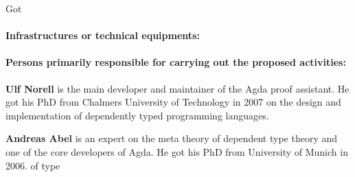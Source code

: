 \begin{sitedescription}{Got}
\paragraph*{Infrastructures or technical equipments:}

\paragraph*{Persons primarily responsible for carrying out the proposed activities:}

\begin{compactitem}
\item{\bf Ulf Norell} is the main developer and maintainer of the Agda
proof assistant. He got his PhD from Chalmers University of Technology in
2007 on the design and implementation of dependently typed programming
languages.
\item{\bf Andreas Abel} is an expert on the meta theory of dependent type
theory and one of the core developers of Agda. He got his PhD from
University of Munich in 2006.
of type
\end{compactitem}

\end{sitedescription}

